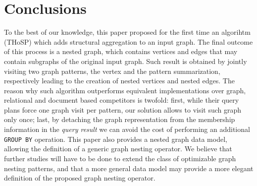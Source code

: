 
\section{Conclusions}
To the best of our knowledge, this paper proposed for the first time an algorihtm (THoSP) which adds structural aggregation to an input graph. The final outcome of this process is a nested graph, which contains vertices and edges that may contain subgraphs of the original input graph. Such result is obtained by jointly visiting two graph patterns, the vertex and the pattern summarization, respectively leading to the creation of nested vertices and nested edges. The reason why such algorithm outperforms equivalent implementations over graph, relational and document based competitors is twofold: first, while their query plans force one graph visit per pattern, our solution allows to visit such graph only once; last, by detaching the graph representation from the membership information in the \textit{query result} we can avoid the cost of performing an additional \texttt{GROUP BY} operation. This paper also provides a nested graph data model, allowing the definition of a generic graph nesting operator.
We believe that further studies will have to be done to extend the class of optimizable graph nesting patterns, and that a more general data model may provide a more elegant definition of the proposed graph nesting operator. 
